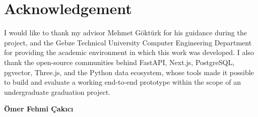 \chapter*{Acknowledgement}

I would like to thank my advisor Mehmet G\"okt\"urk for his guidance during the project, and the Gebze Technical University Computer Engineering Department for providing the academic environment in which this work was developed. I also thank the open-source communities behind FastAPI, Next.js, PostgreSQL, pgvector, Three.js, and the Python data ecosystem, whose tools made it possible to build and evaluate a working end-to-end prototype within the scope of an undergraduate graduation project.



\vspace{1cm}
\begin{flushright}
\textbf{\"Omer Fehmi \c{C}ak{\i}c{\i}} %
\end{flushright}
\clearpage

